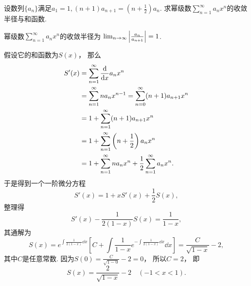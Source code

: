 \begin{example}
设数列\(\{a_n\}\)满足\(a_1 = 1,
(n+1) a_{n+1} = \left( n + \frac12 \right) a_n\).
求幂级数\(\sum_{n=1}^\infty a_n x^n\)的收敛半径与和函数.
\begin{solution}
幂级数\(\sum_{n=1}^\infty a_n x^n\)的收敛半径为
\(\lim_{n\to\infty} \abs{\frac{a_n}{a_{n+1}}} = 1\).

假设它的和函数为\(S(x)\)，
那么\begin{align*}
	S'(x)
	&= \sum_{n=1}^\infty \dv{x} a_n x^n \\
	&= \sum_{n=1}^\infty n a_n x^{n-1}
	= \sum_{n=0}^\infty (n+1) a_{n+1} x^n \\
	&= 1 + \sum_{n=1}^\infty (n+1) a_{n+1} x^n \\
	&= 1 + \sum_{n=1}^\infty \left( n + \frac12 \right) a_n x^n \\
	&= 1 + \sum_{n=1}^\infty n a_n x^n + \frac12 \sum_{n=1}^\infty a_n x^n.
\end{align*}
于是得到一个一阶微分方程\begin{equation*}
	S'(x) = 1 + x S'(x) + \frac12 S(x),
\end{equation*}
整理得\begin{equation*}
	S'(x) - \frac1{2(1-x)} S(x) = \frac1{1-x},
\end{equation*}
其通解为\begin{equation*}
	S(x) = e^{\int \frac1{2(1-x)} \dd{x}}
	\left[ C + \int \frac1{1-x} e^{-\int \frac1{2(1-x)} \dd{x}} \dd{x} \right]
	= \frac{C}{\sqrt{1-x}} - 2,
\end{equation*}
其中\(C\)是任意常数.
因为\(S(0) = \frac{C}{\sqrt{1-0}} - 2 = 0\)，
所以\(C = 2\)，
即\begin{equation*}
	S(x) = \frac2{\sqrt{1-x}} - 2
	\quad(-1<x<1).
\end{equation*}
\end{solution}
\end{example}
